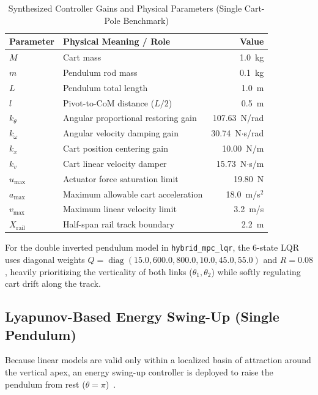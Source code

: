 \documentclass[conference]{IEEEtran}
\begin{document}
\begin{table}[htbp]
\caption{Synthesized Controller Gains and Physical Parameters (Single Cart-Pole Benchmark)}
\begin{center}
\begin{tabular}{llr}
\toprule
\textbf{Parameter} & \textbf{Physical Meaning / Role} & \textbf{Value} \\
\midrule
$M$        & Cart mass                         & 1.0~kg \\
$m$        & Pendulum rod mass                 & 0.1~kg \\
$L$        & Pendulum total length             & 1.0~m \\
$l$        & Pivot-to-CoM distance ($L/2$)     & 0.5~m \\
$k_\theta$ & Angular proportional restoring gain & 107.63~N/rad \\
$k_\omega$ & Angular velocity damping gain     & 30.74~N$\cdot$s/rad \\
$k_x$      & Cart position centering gain      & 10.00~N/m \\
$k_v$      & Cart linear velocity damper       & 15.73~N$\cdot$s/m \\
$u_{\max}$ & Actuator force saturation limit   & 19.80~N \\
$a_{\max}$ & Maximum allowable cart acceleration & 18.0~m/s$^2$ \\
$v_{\max}$ & Maximum linear velocity limit     & 3.2~m/s \\
$X_{\text{rail}}$ & Half-span rail track boundary & 2.2~m \\
\bottomrule
\end{tabular}
\label{tab:gains}
\end{center}
\end{table}

For the double inverted pendulum model in \texttt{hybrid\_mpc\_lqr}, the 6-state LQR uses diagonal weights $Q = \operatorname{diag}(15.0, 600.0, 800.0, 10.0, 45.0, 55.0)$ and $R = 0.08$, heavily prioritizing the verticality of both links ($\theta_1, \theta_2$) while softly regulating cart drift along the track.

\subsection{Lyapunov-Based Energy Swing-Up (Single Pendulum)}
Because linear models are valid only within a localized basin of attraction around the vertical apex, an energy swing-up controller is deployed to raise the pendulum from rest ($\theta = \pi$)~\cite{ref_astrom}.
\end{document}
